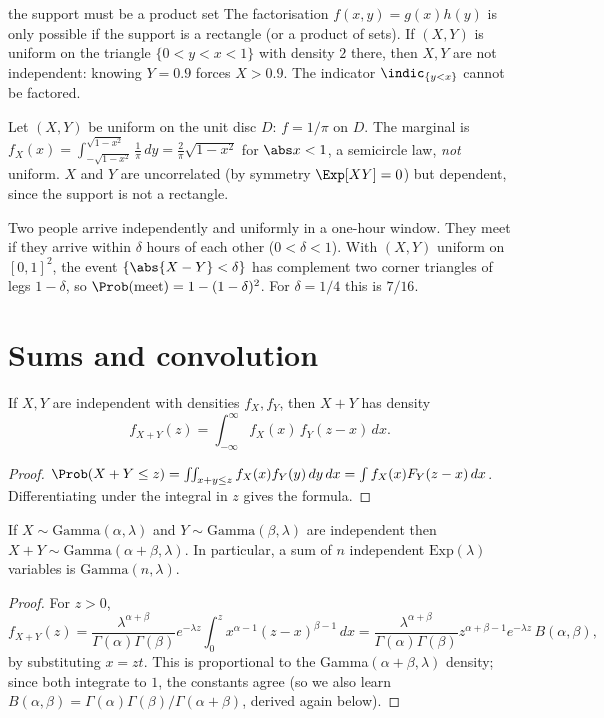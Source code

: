 \begin{nuance}{the support must be a product set}
The factorisation $f(x,y)=g(x)h(y)$ is only possible if the support is a
rectangle (or a product of sets). If $(X,Y)$ is uniform on the triangle
$\{0<y<x<1\}$ with density $2$ there, then $X,Y$ are not independent: knowing
$Y=0.9$ forces $X>0.9$. The indicator $\indic_{\{y<x\}}$ cannot be factored.
\end{nuance}

\begin{example}
Let $(X,Y)$ be uniform on the unit disc $D$: $f=1/\pi$ on $D$. The marginal is
$f_X(x)=\int_{-\sqrt{1-x^2}}^{\sqrt{1-x^2}}\frac1\pi\,dy=\frac2\pi\sqrt{1-x^2}$ for
$\abs x<1$, a semicircle law, \emph{not} uniform. $X$ and $Y$ are uncorrelated (by
symmetry $\Exp[XY]=0$) but dependent, since the support is not a rectangle.
\end{example}

\begin{example}
Two people arrive independently and uniformly in a one-hour window. They meet if
they arrive within $\delta$ hours of each other ($0<\delta<1$). With
$(X,Y)$ uniform on $[0,1]^2$, the event $\{\abs{X-Y}<\delta\}$ has complement two
corner triangles of legs $1-\delta$, so
$\Prob(\text{meet})=1-(1-\delta)^2$. For $\delta=1/4$ this is $7/16$.
\end{example}

\section{Sums and convolution}

\begin{theorem}\label{thm:convcont}
If $X,Y$ are independent with densities $f_X,f_Y$, then $X+Y$ has density
\[
f_{X+Y}(z)=\int_{-\infty}^\infty f_X(x)\,f_Y(z-x)\,dx .
\]
\end{theorem}
\begin{proof}
$\Prob(X+Y\le z)=\iint_{x+y\le z}f_X(x)f_Y(y)\,dy\,dx=\int f_X(x)F_Y(z-x)\,dx$.
Differentiating under the integral in $z$ gives the formula.
\end{proof}

\begin{theorem}\label{thm:gammasum}
If $X\sim\mathrm{Gamma}(\alpha,\lambda)$ and $Y\sim\mathrm{Gamma}(\beta,\lambda)$ are
independent then $X+Y\sim\mathrm{Gamma}(\alpha+\beta,\lambda)$. In particular, a sum of
$n$ independent $\mathrm{Exp}(\lambda)$ variables is $\mathrm{Gamma}(n,\lambda)$.
\end{theorem}
\begin{proof}
For $z>0$,
\[
f_{X+Y}(z)=\frac{\lambda^{\alpha+\beta}}{\Gamma(\alpha)\Gamma(\beta)}e^{-\lambda z}
\int_0^zx^{\alpha-1}(z-x)^{\beta-1}\,dx
=\frac{\lambda^{\alpha+\beta}}{\Gamma(\alpha)\Gamma(\beta)}z^{\alpha+\beta-1}e^{-\lambda z}
\,B(\alpha,\beta),
\]
by substituting $x=zt$. This is proportional to the Gamma$(\alpha+\beta,\lambda)$
density; since both integrate to $1$, the constants agree (so we also learn
$B(\alpha,\beta)=\Gamma(\alpha)\Gamma(\beta)/\Gamma(\alpha+\beta)$, derived again
below).
\end{proof}

